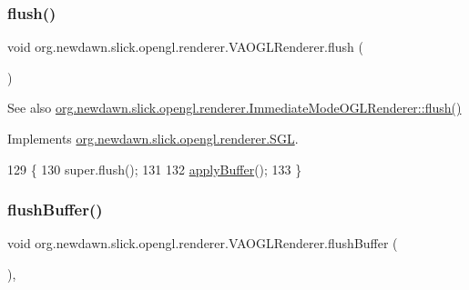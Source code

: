 \subsubsection{\texorpdfstring{flush()}{flush()}}
{\footnotesize\ttfamily void org.\+newdawn.\+slick.\+opengl.\+renderer.\+V\+A\+O\+G\+L\+Renderer.\+flush (\begin{DoxyParamCaption}{ }\end{DoxyParamCaption})\hspace{0.3cm}{\ttfamily [inline]}}

\begin{DoxySeeAlso}{See also}
\mbox{\hyperlink{classorg_1_1newdawn_1_1slick_1_1opengl_1_1renderer_1_1_immediate_mode_o_g_l_renderer_afe7b9f862d9e3c25ade32c1de777577b}{org.\+newdawn.\+slick.\+opengl.\+renderer.\+Immediate\+Mode\+O\+G\+L\+Renderer\+::flush()}} 
\end{DoxySeeAlso}


Implements \mbox{\hyperlink{interfaceorg_1_1newdawn_1_1slick_1_1opengl_1_1renderer_1_1_s_g_l_a97c40969d74b57d2df86421d53b9c55c}{org.\+newdawn.\+slick.\+opengl.\+renderer.\+S\+GL}}.


\begin{DoxyCode}
129                         \{
130         super.flush();
131         
132         \mbox{\hyperlink{classorg_1_1newdawn_1_1slick_1_1opengl_1_1renderer_1_1_v_a_o_g_l_renderer_a7c5d09419cd40761be8f849631aebab5}{applyBuffer}}();
133     \}
\end{DoxyCode}
\mbox{\label{classorg_1_1newdawn_1_1slick_1_1opengl_1_1renderer_1_1_v_a_o_g_l_renderer_ab3e5846e23cb9b7d4018e1ce45e2fea9}} 
\subsubsection{\texorpdfstring{flush\+Buffer()}{flushBuffer()}}
{\footnotesize\ttfamily void org.\+newdawn.\+slick.\+opengl.\+renderer.\+V\+A\+O\+G\+L\+Renderer.\+flush\+Buffer (\begin{DoxyParamCaption}{ }\end{DoxyParamCaption})\hspace{0.3cm}{\ttfamily [inline]}, {\ttfamily [private]}}

